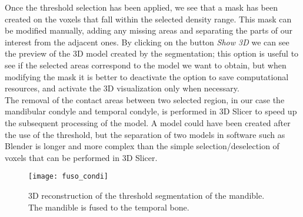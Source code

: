 Once the threshold selection has been applied, we see that a mask has been created on the voxels that fall within the selected density range. This mask can be modified manually, adding any missing areas and separating the parts of our interest from the adjacent ones. By clicking on the button \emph{Show 3D} we can see the preview of the 3D model created by the segmentation; this option is useful to see if the selected areas correspond to the model we want to obtain, but when modifying the mask it is better to deactivate the option to save computational resources, and activate the 3D visualization only when necessary. \\
The removal of the contact areas between two selected region, in our case the mandibular condyle and temporal condyle, is performed in 3D Slicer to speed up the subsequent processing of the model. A model could have been created after the use of the threshold, but the separation of two models in software such as Blender is longer and more complex than the simple selection/deselection of voxels that can be performed in 3D Slicer.

\begin{figure}[h]
\centering
\texttt{[image: fuso\_condi]}
\caption{3D reconstruction of the threshold segmentation of the mandible. The mandible is fused to the temporal bone.}
\label{fig:fuso_condi}
\end{figure}

